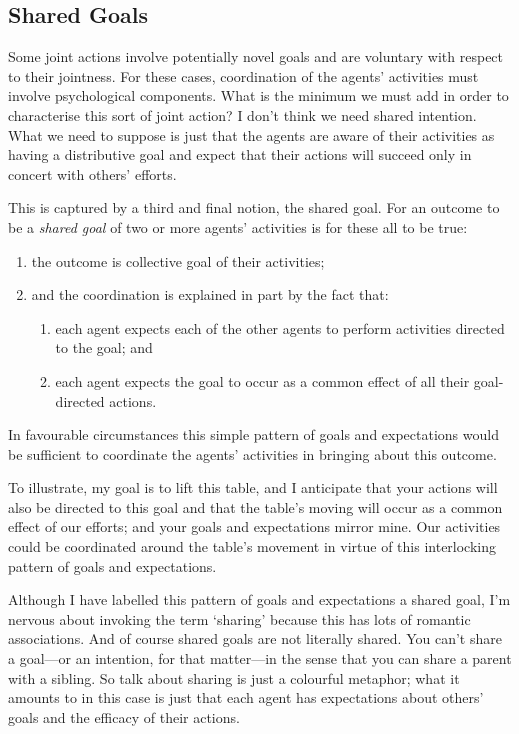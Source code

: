 \documentclass[12pt,a4paper]{extarticle}
\begin{document}
\subsection{Shared Goals}

Some joint actions involve potentially novel goals and are voluntary with respect to their jointness.
For these cases, coordination of the agents' activities must involve psychological components.
What is the minimum we must add in order to characterise this sort of joint action?
I don't think we need shared intention.
What we need to suppose is just that the agents are aware of their activities as having a distributive goal and expect that their actions will succeed only in concert with others' efforts.

This is captured by a third and final notion, the shared goal.
For an outcome to be a \emph{shared goal} of two or more agents' activities is for these all to be true:
\begin{enumerate}
\item the outcome is collective goal of their activities;
\item and the coordination is explained in part by the fact that:
\begin{enumerate}
\item each agent expects each of the other agents to perform activities directed to the goal; and
\item each agent expects the goal to occur as a common effect of all their goal-directed actions.
\end{enumerate}
\end{enumerate}
%
In favourable circumstances this simple pattern of goals and expectations would be sufficient to coordinate the agents’ activities in bringing about this outcome. 

To illustrate, my goal is to lift this table, and I anticipate that your actions will also be directed to this goal and that the table's moving will occur as a common effect of our efforts; and your goals and expectations mirror mine.
Our activities could be coordinated around the table's movement in virtue of this interlocking pattern of goals and expectations. 

Although I have labelled this pattern of goals and expectations a shared goal, I'm nervous about invoking the term `sharing' because this has lots of romantic associations.  And of course shared goals are not literally shared.  You can't share a goal---or an intention, for that matter---in the sense that you can share a parent with a sibling.  So talk about sharing is just a colourful metaphor; what it amounts to in this case is just that each agent has expectations about others' goals and the efficacy of their actions.
\end{document}
